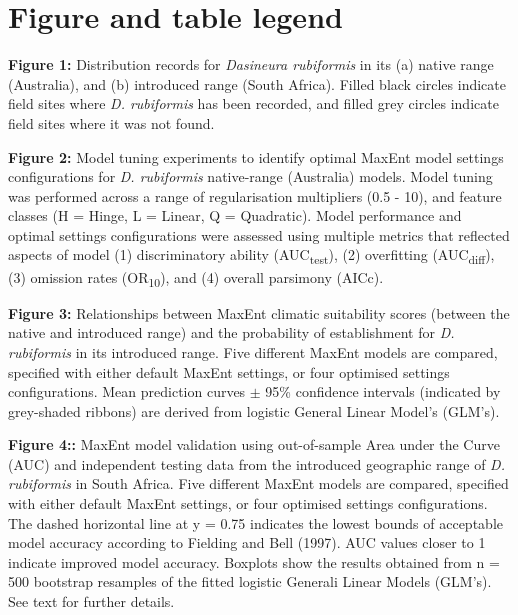 \documentclass[12pt,]{article}
\begin{document}
\newpage

\hypertarget{figure-and-table-legend}{%
\section{Figure and table legend}\label{figure-and-table-legend}}

\setlength{\parindent}{-0.2in}
\setlength{\leftskip}{0.2in}
\setlength{\parskip}{8pt}
\vspace*{-0.2in}

\noindent

\textbf{Figure 1:} Distribution records for \emph{Dasineura rubiformis}
in its (a) native range (Australia), and (b) introduced range (South
Africa). Filled black circles indicate field sites where \emph{D.
rubiformis} has been recorded, and filled grey circles indicate field
sites where it was not found.

\textbf{Figure 2:} Model tuning experiments to identify optimal MaxEnt
model settings configurations for \emph{D. rubiformis} native-range
(Australia) models. Model tuning was performed across a range of
regularisation multipliers (0.5 - 10), and feature classes (H = Hinge, L
= Linear, Q = Quadratic). Model performance and optimal settings
configurations were assessed using multiple metrics that reflected
aspects of model (1) discriminatory ability (AUC\textsubscript{test}),
(2) overfitting (AUC\textsubscript{diff}), (3) omission rates
(OR\textsubscript{10}), and (4) overall parsimony (AICc).

\textbf{Figure 3:} Relationships between MaxEnt climatic suitability
scores (between the native and introduced range) and the probability of
establishment for \emph{D. rubiformis} in its introduced range. Five
different MaxEnt models are compared, specified with either default
MaxEnt settings, or four optimised settings configurations. Mean
prediction curves \(\pm\) 95\% confidence intervals (indicated by
grey-shaded ribbons) are derived from logistic General Linear Model's
(GLM's).

\textbf{Figure 4::} MaxEnt model validation using out-of-sample Area
under the Curve (AUC) and independent testing data from the introduced
geographic range of \emph{D. rubiformis} in South Africa. Five different
MaxEnt models are compared, specified with either default MaxEnt
settings, or four optimised settings configurations. The dashed
horizontal line at y = 0.75 indicates the lowest bounds of acceptable
model accuracy according to Fielding and Bell (1997). AUC values closer
to 1 indicate improved model accuracy. Boxplots show the results
obtained from n = 500 bootstrap resamples of the fitted logistic
Generali Linear Models (GLM's). See text for further details.
\end{document}
